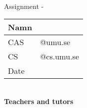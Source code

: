 \begin{titlepage}
	\thispagestyle{empty}
	\noindent {\large \MakeUppercase\university \\
				\instution \\
				\pagetypename \\
			  }

	\begin{center}
	\Large{\textbf{\titleFrontPage}}\\[7pt]

	\large{Assignment \assignmentnumber - \assignmentname}\\[19.7pt]
    
	\begin{tabular}{|p{2cm}|p{8cm}|}
		\hline
		Namn &  \name\\\hline
		CAS & \casuser \hfill @umu.se \\\hline
		CS & \csuser \hfill @cs.umu.se \\\hline
		Date & \datemade\\ \hline
	\end{tabular}\\
	\vfill
	\large{\textbf{Teachers and tutors\\\graders}}\\

	\end{center}
	\thispagestyle{empty}
\end{titlepage}
